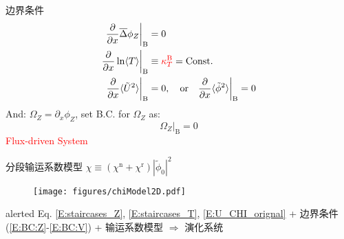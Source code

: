 \documentclass[9pt,aspectratio=169]{ctexbeamer}
\begin{document}
\begin{frame}{\secname}{\subsecname}
  \vspace{-0.6cm}
  \begin{minipage}[t]{0.41\textwidth}
    \begin{exampleblock}{边界条件}
      \vspace{-0.5cm}
      \begin{align}
        \dfrac{\partial}{\partial x}\overline{\Delta}\phi_Z \bigg\vert_{\mathrm{B}}&=0\label{E:BC:Z}\\
        \dfrac{\partial}{\partial x}\ln \langle T\rangle \bigg\vert_{\mathrm{B}}&\equiv \textcolor{red}{\kappa_T^{\mathrm{B}}} = \mathrm{Const.}\label{E:BC:T}\\
        \dfrac{\partial}{\partial x}\langle\tilde{U}^2\rangle \bigg\vert_{\mathrm{B}}&=0,\quad \mathrm{or} \quad \dfrac{\partial}{\partial x}\langle\tilde{\phi}^2\rangle \bigg\vert_{\mathrm{B}}=0\label{E:BC:U}
      \end{align}
      And: $ \Omega_Z=\partial_x\phi_Z $, set B.C. for $ \Omega_Z $ as:
      \begin{equation}\label{E:BC:V}
        \Omega_Z \bigg\vert_{\mathrm{B}} =0
      \end{equation}
      \textcolor{red}{Flux-driven System}
    \end{exampleblock}
  \end{minipage}
  \hspace{0.04\textwidth}
  \begin{minipage}[t]{0.53\textwidth}
    \begin{exampleblock}{分段输运系数模型 \small $ \chi \equiv (\chi^{\text{n}} + \chi^{\text{r}})|\tilde{\phi}_0|^2 $}
      \vspace{0cm}
      \begin{figure}[b]
        \centering
        \texttt{[image: figures/chiModel2D.pdf]}
      \end{figure}
      \vspace{-0.3cm}
    \end{exampleblock}
    \vspace{-0.2cm}
    \begin{tbox}{alerted}
      \small Eq. \eqref{E:staircases_Z}, \eqref{E:staircases_T}, \eqref{E:U_CHI_orignal} + 边界条件 (\ref{E:BC:Z}-\ref{E:BC:V}) + 输运系数模型 $ \Longrightarrow $ 演化系统
    \end{tbox}
  \end{minipage}
\end{frame}
\end{document}
